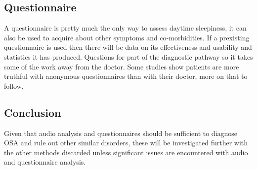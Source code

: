 \subsection{Questionnaire}
A questionnaire is pretty much the only way to assess daytime sleepiness, it can also be used to acquire about other symptoms and co-morbidities. If a prexisting questionnaire is used then there will be data on its effectiveness and usability and statistics it has produced. Questions for part of the diagnostic pathway so it takes some of the work away from the doctor. Some studies show patients are more truthful with anonymous questionnaires than with their doctor, more on that to follow.

\subsection{Conclusion}
Given that audio analysis and questionnaires should be sufficient to diagnose OSA and rule out other similar disorders, these will be investigated further with the other methods discarded unless significant issues are encountered with audio and questionnaire analysis.

\newpage


\newpage


\newpage


\newpage


\newpage


\newpage
